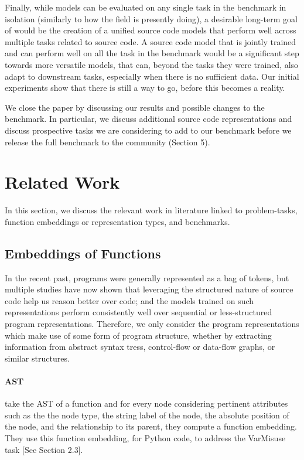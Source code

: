 \documentclass[sigplan,review,anonymous]{acmart}\settopmatter{printfolios=true,printccs=false,printacmref=false}
\begin{document}
Finally, while models can be evaluated on any single task in the benchmark in isolation (similarly to how the field is presently doing), a desirable long-term goal of \benchmarkName would be the creation of a unified source code models that perform well across multiple tasks related to source code. A source code model that is jointly trained and can perform well on all the task in the benchmark would be a significant step towards more versatile models, that can, beyond the tasks they were trained, also adapt to downstream tasks, especially when there is no sufficient data. Our initial experiments show that there is still a way to go, before this becomes a reality.

We close the paper by discussing our results and possible changes to the benchmark. In particular, we discuss additional source code representations and discuss prospective tasks we are considering to add to our benchmark before we release the full benchmark to the community (Section 5). 

\section{Related Work}
\label{sec:relwork}
In this section, we discuss the relevant work in literature linked to problem-tasks, function embeddings or representation types, and benchmarks.

\subsection{Embeddings of Functions}
In the recent past, programs were generally represented as a bag of tokens, but multiple studies have now shown that leveraging the structured nature of source code help us reason better over code; and the models trained on such representations perform consistently well over sequential or less-structured program representations. Therefore, we only consider the program representations which make use of some form of program structure, whether by extracting information from abstract syntax tress, control-flow or data-flow graphs, or similar structures.

\paragraph*{AST} \citet{DBLP:journals/corr/abs-1710-11054} take the AST of a function and for every node considering pertinent attributes such as the the node type, the string label of the node, the absolute position of the node, and the relationship to its parent, they compute a function embedding. They use this function embedding, for Python code, to address the VarMisuse task [See Section 2.3].
\end{document}
